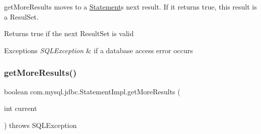 get\+More\+Results moves to a \mbox{\hyperlink{interfacecom_1_1mysql_1_1jdbc_1_1_statement}{Statement}}\textquotesingle{}s next result. If it returns true, this result is a Resul\+Set.

\begin{DoxyReturn}{Returns}
true if the next Result\+Set is valid
\end{DoxyReturn}

\begin{DoxyExceptions}{Exceptions}
{\em S\+Q\+L\+Exception} & if a database access error occurs \\
\hline
\end{DoxyExceptions}
\mbox{\label{classcom_1_1mysql_1_1jdbc_1_1_statement_impl_ae5d2fb5a67dcfe89312b110c52e2194d}} 
\subsubsection{\texorpdfstring{get\+More\+Results()}{getMoreResults()}\hspace{0.1cm}{\footnotesize\ttfamily [2/2]}}
{\footnotesize\ttfamily boolean com.\+mysql.\+jdbc.\+Statement\+Impl.\+get\+More\+Results (\begin{DoxyParamCaption}\item[{int}]{current }\end{DoxyParamCaption}) throws S\+Q\+L\+Exception}


